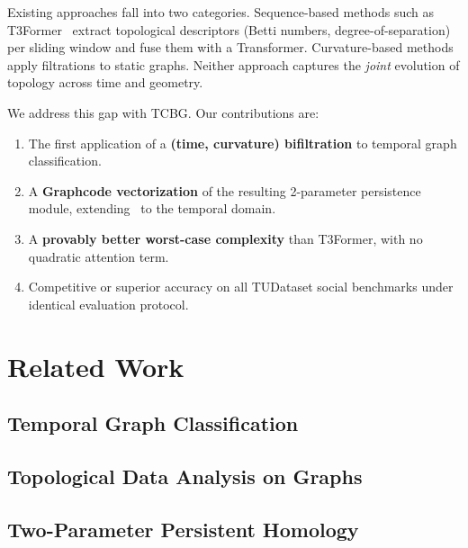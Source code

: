 \documentclass[conference]{IEEEtran}
\begin{document}
Existing approaches fall into two categories. Sequence-based methods
such as T3Former~\cite{t3former2025} extract topological descriptors
(Betti numbers, degree-of-separation) per sliding window and fuse them
with a Transformer. Curvature-based methods~\cite{southern2023curvature}
apply filtrations to static graphs. Neither approach captures the
\emph{joint} evolution of topology across time and geometry.

We address this gap with TCBG. Our contributions are:
\begin{enumerate}
    \item The first application of a \textbf{(time, curvature) bifiltration}
          to temporal graph classification.
    \item A \textbf{Graphcode vectorization} of the resulting 2-parameter
          persistence module, extending~\cite{kerber2024graphcodes} to the
          temporal domain.
    \item A \textbf{provably better worst-case complexity} than T3Former,
          with no quadratic attention term.
    \item Competitive or superior accuracy on all TUDataset social
          benchmarks under identical evaluation protocol.
\end{enumerate}

\section{Related Work}
\label{sec:related}

\subsection{Temporal Graph Classification}

\subsection{Topological Data Analysis on Graphs}

\subsection{Two-Parameter Persistent Homology}

\end{document}
